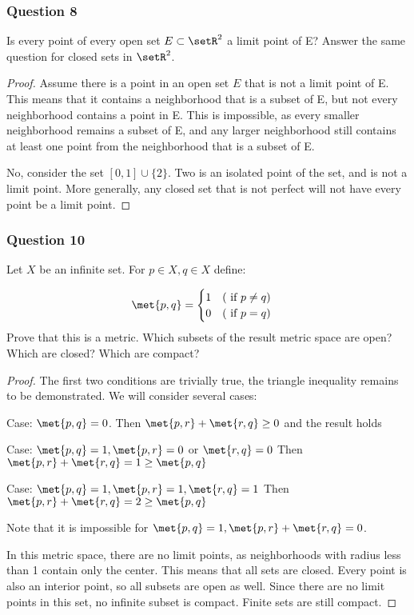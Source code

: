 \documentclass[12pt, letterpaper]{paper}
\begin{document}
\subsubsection{Question 8}
\label{sec:orgffec825}
\begin{question}
  Is every point of every open set $E \subset \setR^2$ a limit point
  of E?  Answer the same question for closed sets in $\setR^2$.
\end{question}
\begin{proof}
  Assume there is a point in an open set $E$ that is not a limit point
  of E. This means that it contains a neighborhood that is a subset of
  E, but not every neighborhood contains a point in E. This is
  impossible, as every smaller neighborhood remains a subset of E, and
  any larger neighborhood still contains at least one point from the
  neighborhood that is a subset of E.

  No, consider the set $[0,1] \cup \{ 2 \}$. Two is an isolated point
  of the set, and is not a limit point. More generally, any closed set
  that is not perfect will not have every point be a limit point.
\end{proof}

\subsubsection{Question 10}
\label{sec:orgdc5dc29}
\begin{question}
  Let $X$ be an infinite set. For $p \in X, q \in X$ define:
  
\begin{align*}
  \met{p,q} = 
  \begin{cases}
    1 \quad (\text{ if } p \neq q )\\
    0 \quad (\text{ if } p = q )\\
  \end{cases}
\end{align*}
Prove that this is a metric. Which subsets of the result metric space
are open? Which are closed? Which are compact?
\end{question}
\begin{proof}
  The first two conditions are trivially true, the triangle inequality
  remains to be demonstrated. We will consider several cases:

  Case: $\met{p,q} = 0$. Then $\met{p,r} + \met{r,q} \geq 0$ and the
  result holds

  Case: $\met{p,q} = 1, \met{p,r} = 0$ or $\met{r,q} = 0$ Then
  $\met{p,r} + \met{r,q} = 1 \geq \met{p,q}$

  Case: $\met{p,q} = 1, \met{p,r} = 1, \met{r,q} = 1$ Then
  $\met{p,r} + \met{r,q} = 2 \geq \met{p,q}$

  Note that it is impossible for
  $\met{p,q} = 1, \met{p,r} + \met{r,q} = 0$.

  In this metric space, there are no limit points, as neighborhoods
  with radius less than 1 contain only the center. This means that all
  sets are closed. Every point is also an interior point, so all
  subsets are open as well. Since there are no limit points in this
  set, no infinite subset is compact. Finite sets are still compact.
\end{proof}
\end{document}
